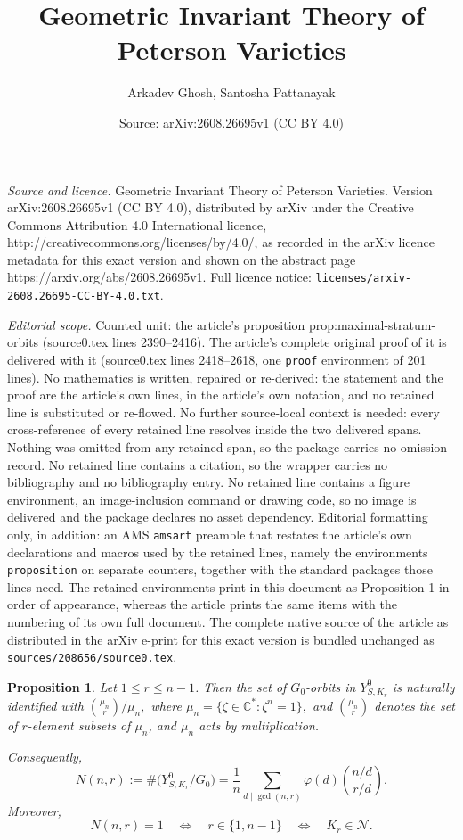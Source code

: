 \documentclass[10pt,a4paper]{amsart}
\title{Geometric Invariant Theory of Peterson Varieties}
\author{Arkadev Ghosh, Santosha Pattanayak}
\date{Source: arXiv:2608.26695v1 (CC BY 4.0)}
\newtheorem{proposition}{Proposition}
\begin{document}
\maketitle

\noindent\emph{Source and licence.} Geometric Invariant Theory of Peterson Varieties. Version arXiv:2608.26695v1 (CC BY 4.0), distributed by arXiv under the Creative Commons Attribution 4.0 International licence, http://creativecommons.org/licenses/by/4.0/, as recorded in the arXiv licence metadata for this exact version and shown on the abstract page https://arxiv.org/abs/2608.26695v1. Full licence notice: \texttt{licenses/arxiv-2608.26695-CC-BY-4.0.txt}.\par\smallskip

\noindent\textit{Editorial scope.} Counted unit: the article's proposition prop:maximal-stratum-orbits (source0.tex lines 2390--2416). The article's complete original proof of it is delivered with it (source0.tex lines 2418--2618, one \texttt{proof} environment of 201 lines). No mathematics is written, repaired or re-derived: the statement and the proof are the article's own lines, in the article's own notation, and no retained line is substituted or re-flowed.  No further source-local context is needed: every cross-reference of every retained line resolves inside the two delivered spans.  Nothing was omitted from any retained span, so the package carries no omission record.  No retained line contains a citation, so the wrapper carries no bibliography and no bibliography entry.  No retained line contains a figure environment, an image-inclusion command or drawing code, so no image is delivered and the package declares no asset dependency.  Editorial formatting only, in addition: an AMS \texttt{amsart} preamble that restates the article's own declarations and macros used by the retained lines, namely the environments \texttt{proposition} on separate counters, together with the standard packages those lines need.  The retained environments print in this document as Proposition 1 in order of appearance, whereas the article prints the same items with the numbering of its own full document.  The complete native source of the article as distributed in the arXiv e-print for this exact version is bundled unchanged as \texttt{sources/208656/source0.tex}.
\begin{proposition}\label{prop:maximal-stratum-orbits}
Let \(1\le r\le n-1\). Then the set of \(G_0\)-orbits in
\(Y^0_{S,K_r}\) is naturally identified with $\binom{\mu_n}{r}\big/\mu_n,$
where $\mu_n=\{\zeta\in\mathbb C^*:\zeta^n=1\},$ and 
\(\binom{\mu_n}{r}\) denotes the set of \(r\)-element subsets of
\(\mu_n\), and \(\mu_n\) acts by multiplication.

Consequently,
\begin{equation}\label{eq:necklace-number}
N(n,r)
:=
\#\bigl(Y^0_{S,K_r}/G_0\bigr)
=
\frac1n
\sum_{d\mid\gcd(n,r)}
\varphi(d)
\binom{n/d}{r/d}.
\end{equation}
Moreover,
\begin{equation}\label{eq:single-orbit-normal}
N(n,r)=1
\quad\Longleftrightarrow\quad
r\in\{1,n-1\}
\quad\Longleftrightarrow\quad
K_r\in\mathcal N.
\end{equation}
\end{proposition}
\end{document}
